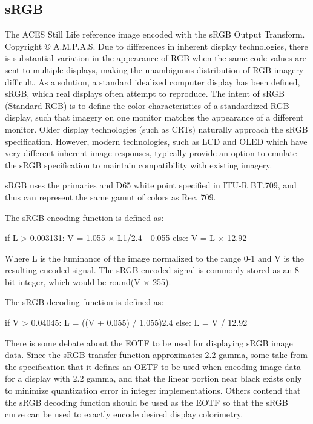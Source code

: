 \subsection{sRGB}
\label{subsec:srgb}

The ACES Still Life reference image encoded with the sRGB Output Transform.
Copyright © A.M.P.A.S.
Due to differences in inherent display technologies, there is substantial variation in the appearance of RGB when the same code values are sent to multiple displays, making the unambiguous distribution of RGB imagery difficult. As a solution, a standard idealized computer display has been defined, sRGB, which real displays often attempt to reproduce. The intent of sRGB (Standard RGB) is to define the color characteristics of a standardized RGB display, such that imagery on one monitor matches the appearance of a different monitor. Older display technologies (such as CRTs) naturally approach the sRGB specification. However, modern technologies, such as LCD and OLED which have very different inherent image responses, typically provide an option to emulate the sRGB specification to maintain compatibility with existing imagery.

sRGB uses the primaries and D65 white point specified in ITU-R BT.709, and thus can represent the same gamut of colors as Rec. 709.

The sRGB encoding function is defined as:

	if L > 0.003131:
            		V = 1.055 × L1/2.4 - 0.055
	else:
		V = L × 12.92

Where L is the luminance of the image normalized to the range 0-1 and V is the resulting encoded signal. The sRGB encoded signal is commonly stored as an 8 bit integer, which would be round(V × 255).

The sRGB decoding function is defined as:

	if V > 0.04045:
            		L = ((V + 0.055) / 1.055)2.4
	else:
		L = V / 12.92

There is some debate about the EOTF to be used for displaying sRGB image data. Since the sRGB transfer function approximates 2.2 gamma, some take from the specification that it defines an OETF to be used when encoding image data for a display with 2.2 gamma, and that the linear portion near black exists only to minimize quantization error in integer implementations. Others contend that the sRGB decoding function should be used as the EOTF so that the sRGB curve can be used to exactly encode desired display colorimetry.

